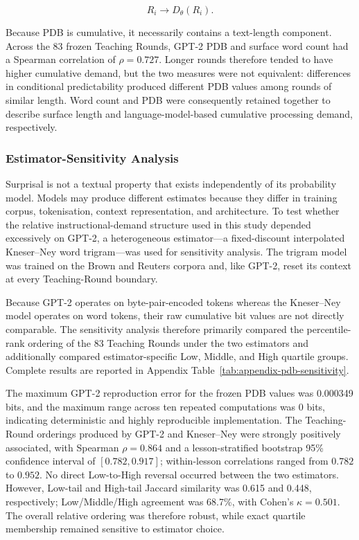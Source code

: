 \[
R_i \longrightarrow D_\theta(R_i).
\]

Because PDB is cumulative, it necessarily contains a text-length component. Across the 83 frozen Teaching Rounds, GPT-2 PDB and surface word count had a Spearman correlation of $\rho=0.727$. Longer rounds therefore tended to have higher cumulative demand, but the two measures were not equivalent: differences in conditional predictability produced different PDB values among rounds of similar length. Word count and PDB were consequently retained together to describe surface length and language-model-based cumulative processing demand, respectively.

\subsubsection{Estimator-Sensitivity Analysis}
\label{subsubsec:pdb-estimator-sensitivity}

Surprisal is not a textual property that exists independently of its probability model. Models may produce different estimates because they differ in training corpus, tokenisation, context representation, and architecture. To test whether the relative instructional-demand structure used in this study depended excessively on GPT-2, a heterogeneous estimator---a fixed-discount interpolated Kneser--Ney word trigram---was used for sensitivity analysis. The trigram model was trained on the Brown and Reuters corpora and, like GPT-2, reset its context at every Teaching-Round boundary.

Because GPT-2 operates on byte-pair-encoded tokens whereas the Kneser--Ney model operates on word tokens, their raw cumulative bit values are not directly comparable. The sensitivity analysis therefore primarily compared the percentile-rank ordering of the 83 Teaching Rounds under the two estimators and additionally compared estimator-specific Low, Middle, and High quartile groups. Complete results are reported in Appendix Table~\ref{tab:appendix-pdb-sensitivity}.

The maximum GPT-2 reproduction error for the frozen PDB values was 0.000349 bits, and the maximum range across ten repeated computations was 0 bits, indicating deterministic and highly reproducible implementation. The Teaching-Round orderings produced by GPT-2 and Kneser--Ney were strongly positively associated, with Spearman $\rho=0.864$ and a lesson-stratified bootstrap 95\% confidence interval of $[0.782,0.917]$; within-lesson correlations ranged from $0.782$ to $0.952$. No direct Low-to-High reversal occurred between the two estimators. However, Low-tail and High-tail Jaccard similarity was 0.615 and 0.448, respectively; Low/Middle/High agreement was 68.7\%, with Cohen's $\kappa=0.501$. The overall relative ordering was therefore robust, while exact quartile membership remained sensitive to estimator choice.

